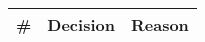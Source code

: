 \begin{longtable}{cXX}
\toprule
\textbf{\#} & \textbf{Decision} & \textbf{Reason} 


\\ \bottomrule
\end{longtable}
